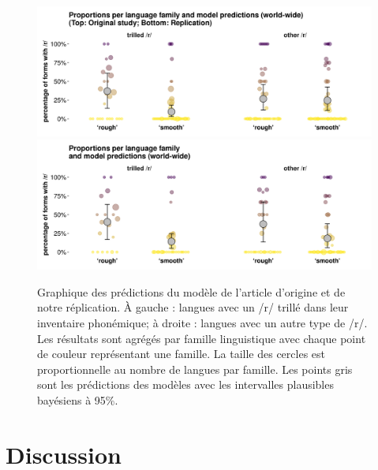 \begin{figure}
	\centering
	\includegraphics[width=1\linewidth, trim={0 0 0 0},clip]{substance/images/xling_model_preds}
	\includegraphics[width=1\linewidth, trim={0 0 0 1.5cm},clip]{substance/images/xling_model_preds_2}
	\caption[Graphique des prédictions du modèle de l'article d'origine et de notre réplication]{Graphique des prédictions du modèle de l'article d'origine et de notre réplication. À gauche : langues avec un /r/ trillé dans leur inventaire phonémique; à droite : langues avec un autre type de /r/. Les résultats sont agrégés par famille linguistique avec chaque point de couleur représentant une famille. La taille des cercles est proportionnelle au nombre de langues par famille. Les points gris sont les prédictions des modèles avec les intervalles plausibles bayésiens à 95\%.}
	\label{fig:xlingmodelpreds}
\end{figure}

\section{Discussion}

